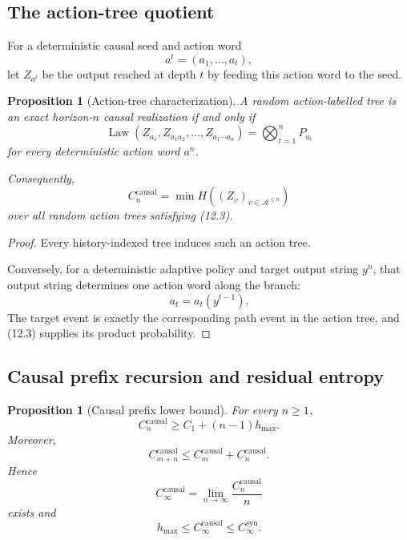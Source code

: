 \documentclass[11pt,a4paper]{article}
\newtheorem{proposition}[theorem]{Proposition}
\newcommand{\Law}{\operatorname{Law}}
\newcommand{\Ccausal}{C^{\mathrm{causal}}}
\newcommand{\CinfSyn}{C_{\infty}^{\mathrm{syn}}}
\newcommand{\CinfCausal}{C_{\infty}^{\mathrm{causal}}}
\newcommand{\cA}{\mathcal A}
\newcommand{\1}{\mathbf 1}
\begin{document}
\subsection{The action-tree quotient}

For a deterministic causal seed and action word
\[
a^t=(a_1,\ldots,a_t),
\]
let \(Z_{a^t}\) be the output reached at depth \(t\) by feeding this
action word to the seed.

\begin{proposition}[Action-tree characterization]
A random action-labelled tree is an exact horizon-\(n\) causal
realization if and only if
\[
\boxed{
\Law
\left(
Z_{a_1},
Z_{a_1a_2},
\ldots,
Z_{a_1\cdots a_n}
\right)
=
\bigotimes_{t=1}^nP_{a_t}
}
\tag{12.3}
\]
for every deterministic action word \(a^n\).

Consequently,
\[
\boxed{
\Ccausal_n
=
\min
H\left(
(Z_v)_{v\in\cA^{\le n}}
\right)
}
\tag{12.4}
\]
over all random action trees satisfying (12.3).
\end{proposition}

\begin{proof}
Every history-indexed tree induces such an action tree.

Conversely, for a deterministic adaptive policy and target output
string \(y^n\), that output string determines one action word along the
branch:
\[
a_t=a_t(y^{t-1}).
\]
The target event is exactly the corresponding path event in the action
tree, and (12.3) supplies its product probability.
\end{proof}


\subsection{Causal prefix recursion and residual entropy}

\begin{proposition}[Causal prefix lower bound]
For every \(n\ge1\),
\[
\boxed{
\Ccausal_n
\ge
C_1+(n-1)h_{\max}.
}
\tag{12.5}
\]
Moreover,
\[
\Ccausal_{m+n}
\le
\Ccausal_m+\Ccausal_n.
\tag{12.6}
\]
Hence
\[
\CinfCausal
=
\lim_{n\to\infty}\frac{\Ccausal_n}{n}
\tag{12.7}
\]
exists and
\[
h_{\max}
\le
\CinfCausal
\le
\CinfSyn.
\tag{12.8}
\]
\end{proposition}
\end{document}
